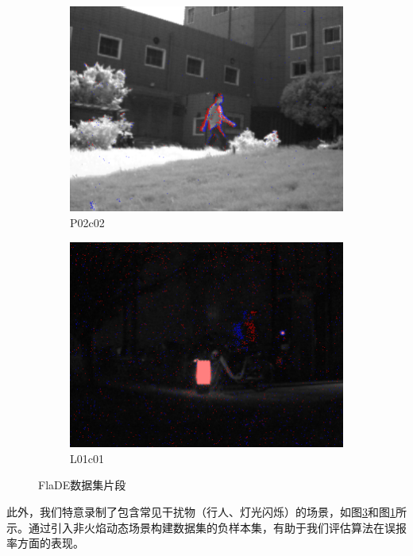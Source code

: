 \begin{figure}[ht]
\begin{subfigure}{0.32\textwidth}
        \includegraphics[width=\textwidth]{figures/FlaDE_05.png}
        \caption{P02\textunderscore c02}
        \label{subfig:FlaDE_06}
    \end{subfigure}
    \hfill
    \begin{subfigure}{0.32\textwidth}
        \centering
        \includegraphics[width=\textwidth]{figures/FlaDE_06.png}
        \caption{L01\textunderscore c01}
        \label{subfig:FlaDE_05}
    \end{subfigure}
    \caption{FlaDE数据集片段}
\end{figure}

此外，我们特意录制了包含常见干扰物（行人、灯光闪烁）的场景，如图\ref{subfig:FlaDE_05}和图\ref{subfig:FlaDE_06}所示。通过引入非火焰动态场景构建数据集的负样本集，有助于我们评估算法在误报率方面的表现。

